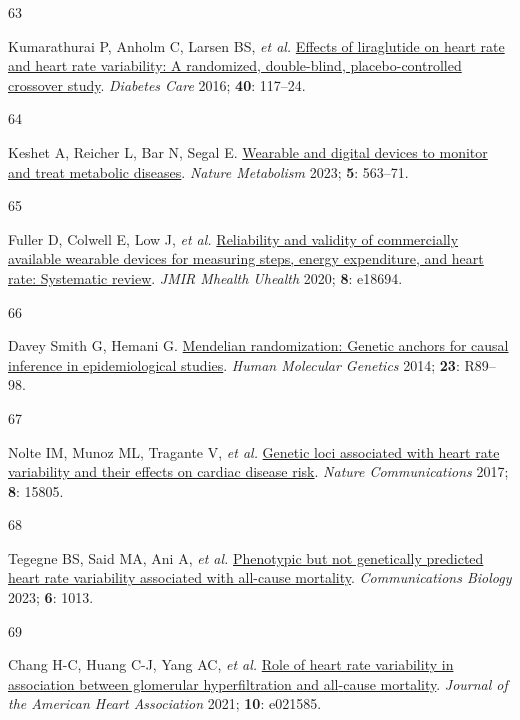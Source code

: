 \documentclass[
  a4paper,
  headsepline=true,
  open=any]{scrbook}
\newlength{\cslhangindent}
\newlength{\csllabelwidth}
\newlength{\cslentryspacingunit} %
\newenvironment{CSLReferences}[2] %
 {%
  \setlength{\parindent}{0pt}
  \ifodd #1
  \let\oldpar\par
  \def\par{\hangindent=\cslhangindent\oldpar}
  \fi
  \setlength{\parskip}{#2\cslentryspacingunit}
 }%
 {}
\newcommand{\CSLLeftMargin}[1]{\parbox[t]{\csllabelwidth}{#1}}
\newcommand{\CSLRightInline}[1]{\parbox[t]{\linewidth - \csllabelwidth}{#1}\break}
\begin{document}
\begin{CSLReferences}{0}{0}
\leavevmode{}%
\CSLLeftMargin{63 }%
\CSLRightInline{Kumarathurai P, Anholm C, Larsen BS, \emph{et al.}
\href{https://doi.org/10.2337/dc16-1580}{Effects of liraglutide on heart
rate and heart rate variability: A randomized, double-blind,
placebo-controlled crossover study}. \emph{Diabetes Care} 2016;
\textbf{40}: 117--24.}

\leavevmode{}%
\CSLLeftMargin{64 }%
\CSLRightInline{Keshet A, Reicher L, Bar N, Segal E.
\href{https://doi.org/10.1038/s42255-023-00778-y}{Wearable and digital
devices to monitor and treat metabolic diseases}. \emph{Nature
Metabolism} 2023; \textbf{5}: 563--71.}

\leavevmode{}%
\CSLLeftMargin{65 }%
\CSLRightInline{Fuller D, Colwell E, Low J, \emph{et al.}
\href{https://doi.org/10.2196/18694}{Reliability and validity of
commercially available wearable devices for measuring steps, energy
expenditure, and heart rate: Systematic review}. \emph{JMIR Mhealth
Uhealth} 2020; \textbf{8}: e18694.}

\leavevmode{}%
\CSLLeftMargin{66 }%
\CSLRightInline{Davey Smith G, Hemani G.
\href{https://doi.org/10.1093/hmg/ddu328}{Mendelian randomization:
Genetic anchors for causal inference in epidemiological studies}.
\emph{Human Molecular Genetics} 2014; \textbf{23}: R89--98.}

\leavevmode{}%
\CSLLeftMargin{67 }%
\CSLRightInline{Nolte IM, Munoz ML, Tragante V, \emph{et al.}
\href{https://doi.org/10.1038/ncomms15805}{Genetic loci associated with
heart rate variability and their effects on cardiac disease risk}.
\emph{Nature Communications} 2017; \textbf{8}: 15805.}

\leavevmode{}%
\CSLLeftMargin{68 }%
\CSLRightInline{Tegegne BS, Said MA, Ani A, \emph{et al.}
\href{https://doi.org/10.1038/s42003-023-05376-y}{Phenotypic but not
genetically predicted heart rate variability associated with all-cause
mortality}. \emph{Communications Biology} 2023; \textbf{6}: 1013.}

\leavevmode{}%
\CSLLeftMargin{69 }%
\CSLRightInline{Chang H-C, Huang C-J, Yang AC, \emph{et al.}
\href{https://doi.org/10.1161/JAHA.121.021585}{Role of heart rate
variability in association between glomerular hyperfiltration and
all{-}cause mortality}. \emph{Journal of the American Heart Association}
2021; \textbf{10}: e021585.}

\end{CSLReferences}
\end{document}
